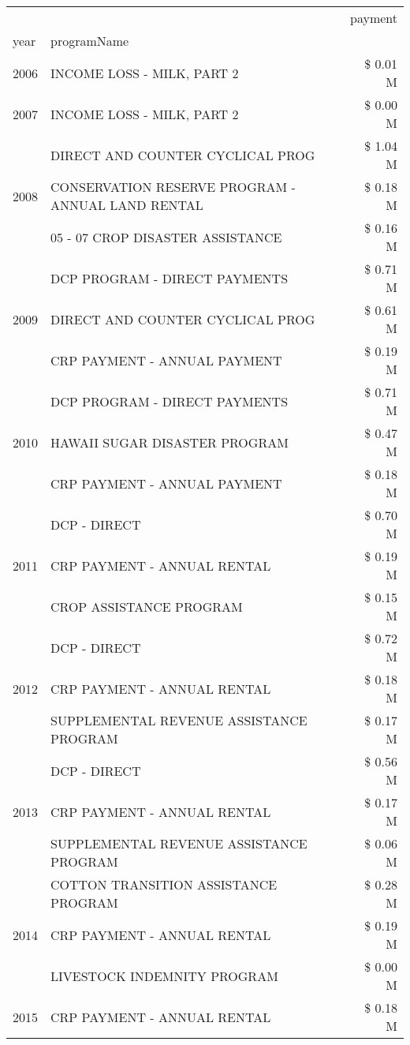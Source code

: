\begin{tabular}{llr}
\toprule
 &  & payment \\
year & programName &  \\
\midrule
2006 & INCOME LOSS - MILK, PART 2 & \$ 0.01 M \\
\cline{1-3}
2007 & INCOME LOSS - MILK, PART 2 & \$ 0.00 M \\
\cline{1-3}
\multirow[t]{3}{*}{2008} & DIRECT AND COUNTER CYCLICAL PROG & \$ 1.04 M \\
 & CONSERVATION RESERVE PROGRAM - ANNUAL LAND RENTAL & \$ 0.18 M \\
 & 05 - 07 CROP DISASTER ASSISTANCE & \$ 0.16 M \\
\cline{1-3}
\multirow[t]{3}{*}{2009} & DCP PROGRAM - DIRECT PAYMENTS & \$ 0.71 M \\
 & DIRECT AND COUNTER CYCLICAL PROG & \$ 0.61 M \\
 & CRP PAYMENT - ANNUAL PAYMENT & \$ 0.19 M \\
\cline{1-3}
\multirow[t]{3}{*}{2010} & DCP PROGRAM - DIRECT PAYMENTS & \$ 0.71 M \\
 & HAWAII SUGAR DISASTER PROGRAM & \$ 0.47 M \\
 & CRP PAYMENT - ANNUAL PAYMENT & \$ 0.18 M \\
\cline{1-3}
\multirow[t]{3}{*}{2011} & DCP - DIRECT & \$ 0.70 M \\
 & CRP PAYMENT - ANNUAL RENTAL & \$ 0.19 M \\
 & CROP ASSISTANCE PROGRAM & \$ 0.15 M \\
\cline{1-3}
\multirow[t]{3}{*}{2012} & DCP - DIRECT & \$ 0.72 M \\
 & CRP PAYMENT - ANNUAL RENTAL & \$ 0.18 M \\
 & SUPPLEMENTAL REVENUE ASSISTANCE PROGRAM & \$ 0.17 M \\
\cline{1-3}
\multirow[t]{3}{*}{2013} & DCP - DIRECT & \$ 0.56 M \\
 & CRP PAYMENT - ANNUAL RENTAL & \$ 0.17 M \\
 & SUPPLEMENTAL REVENUE ASSISTANCE PROGRAM & \$ 0.06 M \\
\cline{1-3}
\multirow[t]{3}{*}{2014} & COTTON TRANSITION ASSISTANCE PROGRAM & \$ 0.28 M \\
 & CRP PAYMENT - ANNUAL RENTAL & \$ 0.19 M \\
 & LIVESTOCK INDEMNITY PROGRAM & \$ 0.00 M \\
\cline{1-3}
\multirow[t]{3}{*}{2015} & CRP PAYMENT - ANNUAL RENTAL & \$ 0.18 M \\

\end{tabular}
